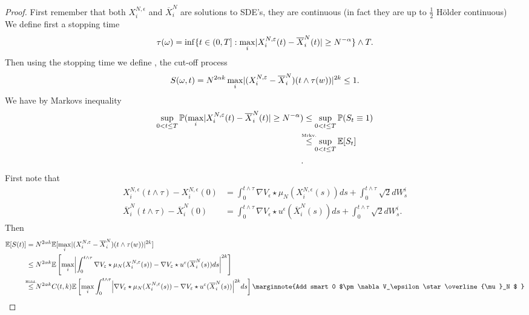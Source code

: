\begin{proof}
  First remember that both $X_i^{N,\epsilon} $ and $\overline{X}^{N}_i  $ are solutions to SDE's, they are continuous (in fact they are up to $\frac{1}{2}$ Hölder continuous) \\[1ex]
 We define first a stopping time 
 \begin{align*}
   \tau(\omega )  = \inf  \{t \in  (0,T] : \max_{i} \lvert X^{N,\varepsilon}_i(t) - \overline{X}_i^{N}(t)\rvert \ge  N^{-\alpha}  \}   \land T 
 .\end{align*}
Then using the stopping time we define , the cut-off process 
\begin{align*}
  S(\omega,t) =  N^{2\alpha k } \max_{i} \lvert(X^{N,\varepsilon}_i - \overline{X}_i^{N})(t \land \tau(w))\rvert^{2k}  \le  1
.\end{align*}
 We have by Markovs inequality  
 \begin{align*}
   \sup_{0 < t \le  T} \P( \max_{i} \abs{X^{N,\epsilon}_i(t) - \overline{X}_i^{N}(t)   } \ge N^{-\alpha } ) &\le  \sup_{0 < t \le T} \P(S_t \equiv 1)\\
                                                                                                            &\myS{Mrkv.}{\le } \sup_{0 < t \le T} \E[S_t] \\
 .\end{align*}
 First note that
\begin{align*}
  X_i^{N,\epsilon} (t \land \tau ) - X_i^{N,\epsilon} (0) &= \int_0^{t \land \tau }  \nabla V_{\epsilon} \star  \mu_N(X_i^{N,\epsilon}(s) ) ds + \int_0^{t \land \tau }  \sqrt{2} dW_s^{i}  \\
  \overline{X}_i^{N} (t \land \tau ) - \overline{X}_i^{N} (0) &= \int_0^{t \land \tau }  \nabla V_{\epsilon} \star  u^{\epsilon}(\overline{X}_i^{N}(s) ) ds + \int_0^{t \land \tau }  \sqrt{2} dW_s^{i}  
.\end{align*}
Then 
\begin{align*}
  \E[S(t)] &= N^{2\alpha k } \E[\max_{i} \abs{(X^{N,\epsilon}_i - \overline{X}_i^{N})(t \land \tau(w))}^{2k}] \\
           &\le  N^{2 \alpha  k}  \E\left[ \max_{i}\abs*{\int_0^{t \land \tau }  \nabla V_{\epsilon} \star  \mu_N(X_i^{N,\epsilon}(s) ) -  \nabla V_{\epsilon} \star  u^{\epsilon}(\overline{X}_i^{N}(s) )ds}^{2k}  \right]\\
           &\myS{Höld.}{\le} N^{2 \alpha  k} C(t,k)  \E\left[ \max_{i}\int_0^{t \land \tau }  \abs*{\nabla V_{\epsilon} \star  \mu_N(X_i^{N,\epsilon}(s) ) -  \nabla V_{\epsilon} \star  u^{\epsilon}(\overline{X}_i^{N}(s) ) }^{2k} ds  \right]\marginnote{Add smart 0 $\pm \nabla V_\epsilon \star  \overline{\mu }_N $ }\\

\end{align*}
\end{proof}
